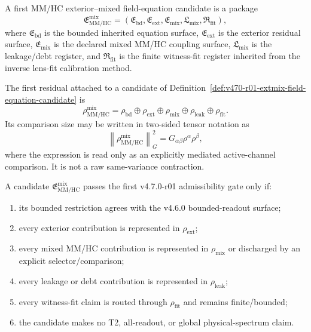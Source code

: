 \begin{definition}
\label{def:v470-r01-extmix-field-equation-candidate}
A first MM/HC exterior--mixed field-equation candidate is a package
\[
\mathfrak E^{\mathrm{mix}}_{\mathrm{MM/HC}}
=
\left(
\mathfrak E_{\mathrm{bd}},
\mathfrak E_{\mathrm{ext}},
\mathfrak E_{\mathrm{mix}},
\mathfrak L_{\mathrm{mix}},
\mathfrak R_{\mathrm{fit}}
\right),
\]
where \(\mathfrak E_{\mathrm{bd}}\) is the bounded inherited equation surface,
\(\mathfrak E_{\mathrm{ext}}\) is the exterior residual surface,
\(\mathfrak E_{\mathrm{mix}}\) is the declared mixed MM/HC coupling surface,
\(\mathfrak L_{\mathrm{mix}}\) is the leakage/debt register, and
\(\mathfrak R_{\mathrm{fit}}\) is the finite witness-fit register inherited from
the inverse lens-fit calibration method.
\end{definition}

\begin{definition}
\label{def:v470-r01-admissibility-residual}
The first residual attached to a candidate of
Definition~\ref{def:v470-r01-extmix-field-equation-candidate} is
\[
\rho^{\mathrm{mix}}_{\mathrm{MM/HC}}
=
\rho_{\mathrm{bd}}
\oplus
\rho_{\mathrm{ext}}
\oplus
\rho_{\mathrm{mix}}
\oplus
\rho_{\mathrm{leak}}
\oplus
\rho_{\mathrm{fit}}.
\]
Its comparison size may be written in two-sided tensor notation as
\[
\left\|\rho^{\mathrm{mix}}_{\mathrm{MM/HC}}\right\|^2_{G}
=
G_{\alpha\beta}\rho^{\alpha}\rho^{\beta},
\]
where the expression is read only as an explicitly mediated active-channel
comparison.  It is not a raw same-variance contraction.
\end{definition}

\begin{proposition}
\label{prop:v470-r01-first-admissibility-gate}
A candidate \(\mathfrak E^{\mathrm{mix}}_{\mathrm{MM/HC}}\) passes the first
v4.7.0-r01 admissibility gate only if:
\begin{enumerate}[label=(\roman*)]
    \item its bounded restriction agrees with the v4.6.0 bounded-readout surface;
    \item every exterior contribution is represented in
    \(\rho_{\mathrm{ext}}\);
    \item every mixed MM/HC contribution is represented in
    \(\rho_{\mathrm{mix}}\) or discharged by an explicit selector/comparison;
    \item every leakage or debt contribution is represented in
    \(\rho_{\mathrm{leak}}\);
    \item every witness-fit claim is routed through
    \(\rho_{\mathrm{fit}}\) and remains finite/bounded;
    \item the candidate makes no T2, all-readout, or global physical-spectrum
    claim.
\end{enumerate}
\end{proposition}

